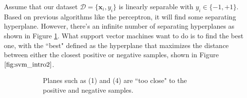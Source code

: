   \begin{example}
    Assume that our dataset $\mathcal{D} = \{\mathbf{x}_i, y_i\}$ is linearly separable with $y_i \in \{-1, +1\}$. Based on previous algorithms like the perceptron, it will find some separating hyperplane. However, there's an infinite number of separating hyperplanes as shown in Figure \ref{fig:svm_intro_1}. What support vector machines want to do is to find the best one, with the ``best" defined as the hyperplane that maximizes the distance between either the closest positive or negative samples, shown in Figure $\ref{fig:svm_intro2}$.  

    \begin{figure}[H] 
      \centering 
      \begin{subfigure}[b]{0.45\textwidth} 
        \centering 
        \caption{Planes such as (1) and (4) are ``too close" to the positive and negative samples. } 
        \label{fig:svm_intro_1}
      \end{subfigure}
      \hfill
      \begin{subfigure}[b]{0.45\textwidth} 
        \centering 
\end{subfigure}
\end{figure}
\end{example}
